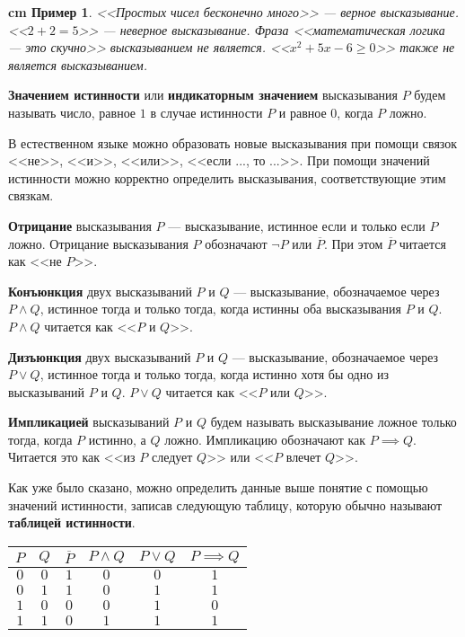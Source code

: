 \documentclass[12pt, russian]{article}
\newtheorem{example}{\hskip 0.5 cm Пример}%
\let\ge=\geqslant
\begin{document}
\begin{example}
	<<Простых чисел бесконечно много>> --- верное высказывание. <<$2+2=5$>> --- неверное высказывание. Фраза <<математическая логика --- это скучно>> высказыванием не является. <<$x^2 + 5x - 6 \ge 0$>> также не является высказыванием.
\end{example}

\textbf{Значением истинности} или \textbf{индикаторным значением} высказывания $P$ будем называть число, равное $1$ в случае истинности $P$ и равное $0$, когда $P$ ложно.

В естественном языке можно образовать новые высказывания при помощи связок <<не>>, <<и>>, <<или>>, <<если ..., то ...>>. При помощи значений истинности можно корректно определить высказывания, соответствующие этим связкам.

\textbf{Отрицание} высказывания $P$ --- высказывание, истинное если  и только если $P$ ложно. Отрицание высказывания $P$ обозначают $\neg P$ или $\overline{P}$. При этом $\overline{P}$ читается как <<не $P$>>.

\textbf{Конъюнкция} двух высказываний $P$ и $Q$ --- высказывание, обозначаемое через $P \wedge Q$, истинное тогда и только тогда, когда истинны оба высказывания $P$ и $Q$. $P \wedge Q$ читается как <<$P$ и $Q$>>.

\textbf{Дизъюнкция} двух высказываний $P$ и $Q$ --- высказывание, обозначаемое через $P \vee Q$, истинное тогда и только тогда, когда истинно хотя бы одно из высказываний $P$ и $Q$. $P \vee Q$ читается как <<$P$ или $Q$>>. 

\textbf{Импликацией} высказываний $P$ и $Q$ будем называть высказывание ложное только тогда, когда $P$ истинно, а $Q$ ложно. Импликацию обозначают как $P \implies Q$. Читается это как <<из $P$ следует $Q$>> или <<$P$ влечет $Q$>>.

Как уже было сказано, можно определить данные выше понятие с помощью значений истинности, записав следующую таблицу, которую обычно называют \textbf{таблицей истинности}.

\begin{center}
\begin{tabular}{ |c|c|c|c|c|c| } 
	\hline
		$P$ & $Q$ & $\overline{P}$  & $P\wedge Q$ & $P \vee Q$ & $P \implies Q$\\ \hline
		$0$ & $0$ & $1$ & $0$ & $0$ & $1$ \\ \hline
		$0$ & $1$ & $1$ & $0$ & $1$ & $1$ \\ \hline
		$1$ & $0$ & $0$ & $0$ & $1$ & $0$ \\ \hline
		$1$ & $1$ & $0$ & $1$ & $1$ & $1$ \\
	\hline
\end{tabular}
\end{center}
\end{document}
